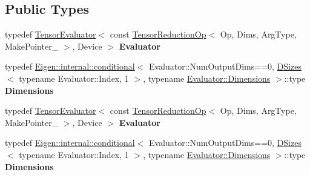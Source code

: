 \subsection*{Public Types}
\begin{DoxyCompactItemize}
\item 
\mbox{\label{struct_eigen_1_1_tensor_sycl_1_1internal_1_1_functor_extractor_3_01_tensor_evaluator_3_01const_08e46bb7792b8f07bb791a4ece83b9c3b_a4352ac10628e16701f9a565d1fcc5abf}} 
typedef \hyperlink{struct_eigen_1_1_tensor_evaluator}{Tensor\+Evaluator}$<$ const \hyperlink{class_eigen_1_1_tensor_reduction_op}{Tensor\+Reduction\+Op}$<$ Op, Dims, Arg\+Type, Make\+Pointer\+\_\+ $>$, Device $>$ {\bfseries Evaluator}
\item 
\mbox{\label{struct_eigen_1_1_tensor_sycl_1_1internal_1_1_functor_extractor_3_01_tensor_evaluator_3_01const_08e46bb7792b8f07bb791a4ece83b9c3b_a1da9bb47b00ab77dfb87b68d5e8efd0c}} 
typedef \hyperlink{struct_eigen_1_1internal_1_1conditional}{Eigen\+::internal\+::conditional}$<$ Evaluator\+::\+Num\+Output\+Dims==0, \hyperlink{struct_eigen_1_1_d_sizes}{D\+Sizes}$<$ typename Evaluator\+::\+Index, 1 $>$, typename \hyperlink{class_eigen_1_1internal_1_1_tensor_lazy_evaluator_writable}{Evaluator\+::\+Dimensions} $>$\+::type {\bfseries Dimensions}
\item 
\mbox{\label{struct_eigen_1_1_tensor_sycl_1_1internal_1_1_functor_extractor_3_01_tensor_evaluator_3_01const_08e46bb7792b8f07bb791a4ece83b9c3b_a4352ac10628e16701f9a565d1fcc5abf}} 
typedef \hyperlink{struct_eigen_1_1_tensor_evaluator}{Tensor\+Evaluator}$<$ const \hyperlink{class_eigen_1_1_tensor_reduction_op}{Tensor\+Reduction\+Op}$<$ Op, Dims, Arg\+Type, Make\+Pointer\+\_\+ $>$, Device $>$ {\bfseries Evaluator}
\item 
\mbox{\label{struct_eigen_1_1_tensor_sycl_1_1internal_1_1_functor_extractor_3_01_tensor_evaluator_3_01const_08e46bb7792b8f07bb791a4ece83b9c3b_a1da9bb47b00ab77dfb87b68d5e8efd0c}} 
typedef \hyperlink{struct_eigen_1_1internal_1_1conditional}{Eigen\+::internal\+::conditional}$<$ Evaluator\+::\+Num\+Output\+Dims==0, \hyperlink{struct_eigen_1_1_d_sizes}{D\+Sizes}$<$ typename Evaluator\+::\+Index, 1 $>$, typename \hyperlink{class_eigen_1_1internal_1_1_tensor_lazy_evaluator_writable}{Evaluator\+::\+Dimensions} $>$\+::type {\bfseries Dimensions}
\end{DoxyCompactItemize}
